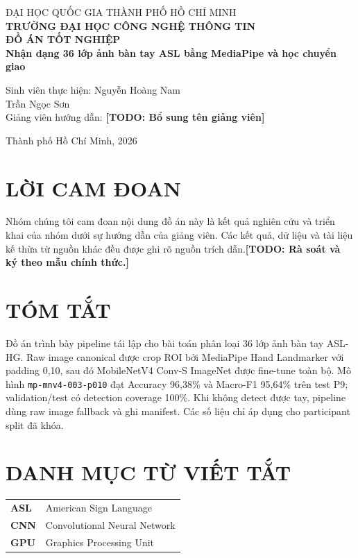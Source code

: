 \documentclass[12pt,a4paper]{report}
\newcommand{\todo}[1]{\textbf{[TODO: #1]}}
\newcommand{\thesistitle}{Nhận dạng 36 lớp ảnh bàn tay ASL bằng MediaPipe và học chuyển giao}
\begin{document}
\begin{titlepage}
\centering
{\large ĐẠI HỌC QUỐC GIA THÀNH PHỐ HỒ CHÍ MINH\\
\textbf{TRƯỜNG ĐẠI HỌC CÔNG NGHỆ THÔNG TIN}}\\[2cm]
{\Large \textbf{ĐỒ ÁN TỐT NGHIỆP}}\\[1.5cm]
{\LARGE \textbf{\thesistitle}}\\[2cm]
\begin{flushleft}
\large
Sinh viên thực hiện: Nguyễn Hoàng Nam\\
\hspace*{4.25cm}Trần Ngọc Sơn\\[0.5cm]
Giảng viên hướng dẫn: \todo{Bổ sung tên giảng viên}
\end{flushleft}
\vfill
{\large Thành phố Hồ Chí Minh, 2026}
\end{titlepage}

\chapter*{LỜI CAM ĐOAN}
Nhóm chúng tôi cam đoan nội dung đồ án này là kết quả nghiên cứu và triển khai của nhóm dưới sự hướng dẫn của giảng viên. Các kết quả, dữ liệu và tài liệu kế thừa từ nguồn khác đều được ghi rõ nguồn trích dẫn.\todo{Rà soát và ký theo mẫu chính thức.}

\chapter*{TÓM TẮT}
Đồ án trình bày pipeline tái lập cho bài toán phân loại 36 lớp ảnh bàn tay ASL-HG. Raw image canonical được crop ROI bởi MediaPipe Hand Landmarker với padding 0,10, sau đó MobileNetV4 Conv-S ImageNet được fine-tune toàn bộ. Mô hình \texttt{mp-mnv4-003-p010} đạt Accuracy 96,38\% và Macro-F1 95,64\% trên test P9; validation/test có detection coverage 100\%. Khi không detect được tay, pipeline dùng raw image fallback và ghi manifest. Các số liệu chỉ áp dụng cho participant split đã khóa.

\chapter*{DANH MỤC TỪ VIẾT TẮT}
\begin{tabular}{>{\bfseries}p{3cm}p{10cm}}
ASL & American Sign Language\\
CNN & Convolutional Neural Network\\
GPU & Graphics Processing Unit\\
\end{tabular}
\end{document}
